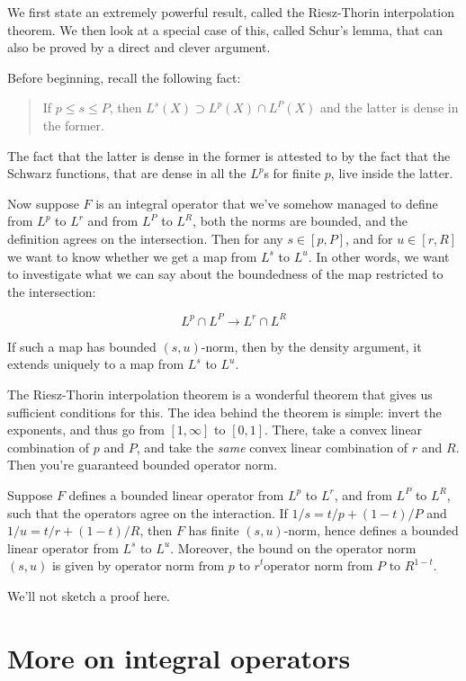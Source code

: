 \documentclass[a4paper]{amsart}
\begin{document}
We first state an extremely powerful result, called the Riesz-Thorin
interpolation theorem. We then look at a special case of this, called
Schur's lemma, that can also be proved by a direct and clever argument.

Before beginning, recall the following fact:

\begin{quote}
  If $p \le s \le P$, then $L^s(X) \supset L^p(X) \cap L^P(X)$ and the
  latter is dense in the former.
\end{quote}

The fact that the latter is dense in the former is attested to by the
fact that the Schwarz functions, that are dense in all the $L^p$s for
finite $p$, live inside the latter.

Now suppose $F$ is an integral operator that we've somehow managed to
define from $L^p$ to $L^r$ and from $L^P$ to $L^R$, both the norms are
bounded, and the definition agrees on the intersection. Then for any
$s \in [p,P]$, and for $u \in [r,R]$ we want to know whether we get a
map from $L^s$ to $L^u$. In other words, we want to investigate what
we can say about the boundedness of the map restricted to the intersection:

$$L^p \cap L^P \to L^r \cap L^R$$

If such a map has bounded $(s,u)$-norm, then by the density argument,
it extends uniquely to a map from $L^s$ to $L^u$.

The Riesz-Thorin interpolation theorem is a wonderful theorem that
gives us sufficient conditions for this. The idea behind the theorem
is simple: invert the exponents, and thus go from $[1,\infty]$ to
$[0,1]$. There, take a convex linear combination of $p$ and $P$, and
take the {\em same} convex linear combination of $r$ and $R$. Then you're
guaranteed bounded operator norm.

\begin{theorem}
  Suppose $F$ defines a bounded linear operator from $L^p$ to $L^r$,
  and from $L^P$ to $L^R$, such that the operators agree on the
  interaction. If $1/s = t/p + (1-t)/P$ and $1/u = t/r + (1 -t)/R$,
  then $F$ has finite $(s,u)$-norm, hence defines a bounded linear
  operator from $L^s$ to $L^u$. Moreover, the bound on the operator
  norm $(s,u)$ is given by $\text{operator norm from $p$ to
    $r$}^t\text{operator norm from $P$ to $R$}^{1-t}$.
\end{theorem}

We'll not sketch a proof here.
\section{More on integral operators}
\end{document}
